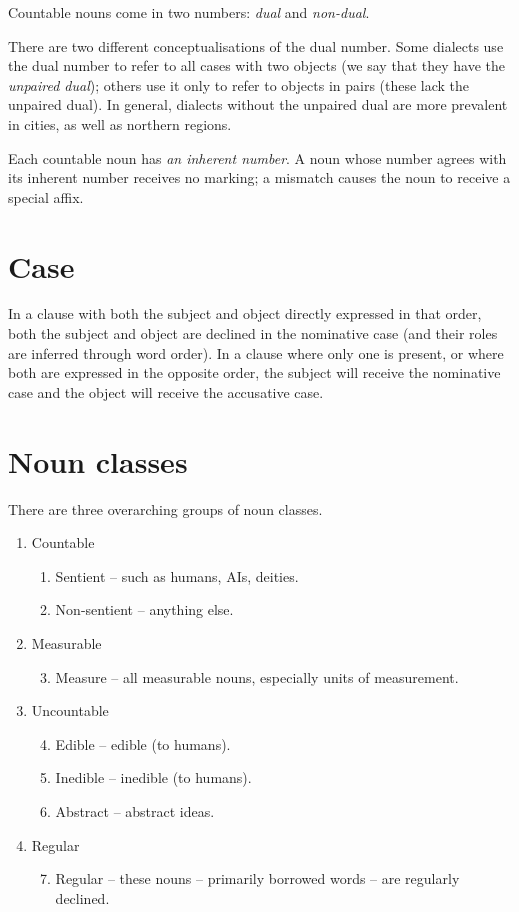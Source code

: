 \documentclass{book}
\begin{document}
Countable nouns come in two numbers: \emph{dual} and \emph{non-dual}.

There are two different conceptualisations of the dual number. Some dialects use the dual number to refer to all cases with two objects (we say that they have the \emph{unpaired dual}); others use it only to refer to objects in pairs (these lack the unpaired dual). In general, dialects without the unpaired dual are more prevalent in cities, as well as northern regions.

Each countable noun has \emph{an inherent number}. A noun whose number agrees with its inherent number receives no marking; a mismatch causes the noun to receive a special affix.

\section{Case}

In a clause with both the subject and object directly expressed in that order, both the subject and object are declined in the nominative case (and their roles are inferred through word order). In a clause where only one is present, or where both are expressed in the opposite order, the subject will receive the nominative case and the object will receive the accusative case.

\section{Noun classes}

There are three overarching groups of noun classes.

\begin{enumerate}
  \item Countable
  \begin{enumerate}
    \item Sentient -- such as humans, AIs, deities.
    \item Non-sentient -- anything else.
  \end{enumerate}
  \item Measurable
  \begin{enumerate}
    \setcounter{enumi}{2}
    \item Measure -- all measurable nouns, especially units of measurement.
  \end{enumerate}
  \item Uncountable
  \begin{enumerate}
    \setcounter{enumi}{3}
    \item Edible -- edible (to humans).
    \item Inedible -- inedible (to humans).
    \item Abstract -- abstract ideas.
  \end{enumerate}
  \item Regular
  \begin{enumerate}
    \setcounter{enumi}{6}
    \item Regular -- these nouns -- primarily borrowed words -- are regularly declined.
  \end{enumerate}
\end{enumerate}
\end{document}
